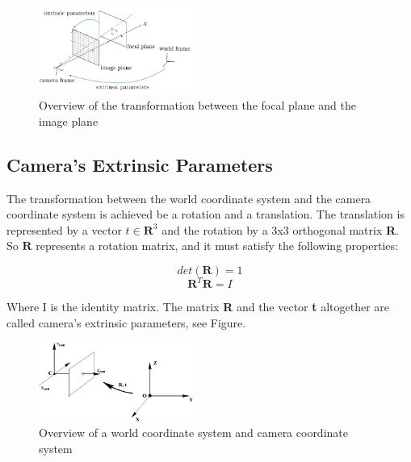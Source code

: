 \begin{figure}[!h]
\begin{center}
\includegraphics[width=2in]{figures02/intrinsic.png}
\caption{Overview of the transformation between the focal plane and the image plane}%
\label{fig:intrinsic}
\end{center}
\end{figure}


\subsection{Camera's Extrinsic Parameters}

The transformation between the world coordinate system and the camera coordinate system is achieved be a rotation and a translation. The translation is represented by a vector $t \in \textbf{R}^{3}$ and the rotation by a 3x3 orthogonal matrix \textbf{R}. So $\textbf{R}$ represents a rotation matrix, and it must satisfy the following properties:

\begin{equation}\label{eq3} 
     det(\textbf{R})=1 
\end{equation}
\begin{equation}\label{eq4}  
    \textbf{R}^{T}\textbf{R}=I      
\end{equation}


Where I is the identity matrix. The matrix \textbf{R} and the vector \textbf{t} altogether are called camera's extrinsic parameters, see Figure.

\begin{figure}[!h]
\begin{center}
\includegraphics[width=2in]{figures02/extrinsic.png}
\caption{Overview of a world coordinate system and camera coordinate system}%
\end{center}
\end{figure}


